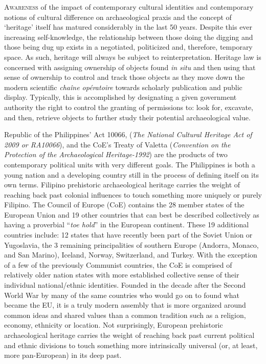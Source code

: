 %
\IJSRAopening
\lettrine{A}{wareness} of the impact of contemporary cultural identities and contemporary notions of cultural difference on archaeological praxis and the concept of ‘heritage’ itself has matured considerably in the last 50 years. Despite this ever increasing self-knowledge, the relationship between those doing the digging and those being dug up exists in a negotiated, politicized and, therefore, temporary space. As such, heritage will always be subject to reinterpretation. Heritage law is concerned with assigning ownership of objects found \textit{in situ} and then using that sense of ownership to control and track those objects as they move down the modern scientific \textit{chaîne opératoire}  towards scholarly publication and public display. Typically, this is accomplished by designating a given government authority the right to control the granting of permissions to: look for, excavate, and then, retrieve objects to further study their potential archaeological value. 

Republic of the Philippines’ Act 10066, (\textit{The National Cultural Heritage Act of 2009 or RA10066}), and the CoE’s Treaty of Valetta (\textit{Convention on the Protection of the Archaeological Heritage-1992}) are the products of two contemporary political units with very different goals. The Philippines is both a young nation and a developing country still in the process of defining itself on its own terms. Filipino prehistoric archaeological heritage carries the weight of reaching back past colonial influences to touch something more uniquely or purely Filipino. 
The Council of Europe (CoE) contains the \num{28} member states of the European Union and 19 other countries that can best be described collectively as having a proverbial “\textit{toe hold}” in the European continent. 
These \num{19} additional countries include: \num{12} states that have recently been part of the Soviet Union or Yugoslavia, the 3 remaining principalities of southern Europe (Andorra, Monaco, and San Marino), Iceland, Norway, Switzerland, and Turkey.  With the exception of a few of the previously Communist countries, the CoE is comprised of relatively older nation states with more established collective sense of their individual national/ethnic identities. Founded in the decade after the Second World War by many of the same countries who would go on to found what became the EU, it is a truly modern assembly that is more organized around common ideas and shared values than a common tradition such as a religion, economy, ethnicity or location. Not surprisingly, European prehistoric archaeological heritage carries the weight of reaching back past current political and ethnic divisions to touch something more intrinsically universal (or, at least, more pan-European) in its deep past. 

